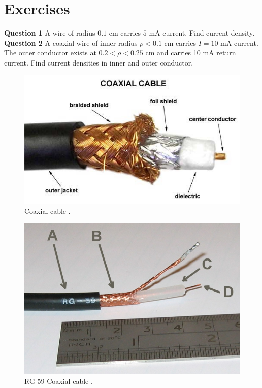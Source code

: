 \documentclass[12pt,a4paper]{article}
\begin{document}
\section{Exercises}
\noindent\textbf{Question 1} A wire of radius $0.1$ cm carries $5$ mA current. Find current density.\\[0.2cm]
\noindent\textbf{Question 2} A coaxial wire of inner radius $\rho<0.1$ cm carries $I=10$ mA current. The outer conductor exists at $0.2<\rho<0.25$ cm and carries 10 mA return current. Find current densities in inner and outer conductor.\\[0.2cm]
\begin{minipage}{0.5\textwidth}
\begin{figure}[H]
\centering
\includegraphics[scale=0.45]{CoaxialCable01.jpg}
\caption{Coaxial cable \cite{Ref:CoaxialCable01}.}
\label{Coaxial-cable}
\end{figure}
\end{minipage}
\begin{minipage}{0.5\textwidth}
\begin{figure}[H]
\centering
\includegraphics[scale=0.325]{CoaxialCable02.jpg}
\caption{RG-59 Coaxial cable \cite{Ref:CoaxialCable02}.}
\label{Coaxial-cable-rg59}
\end{figure}
\end{minipage}


\end{document}
